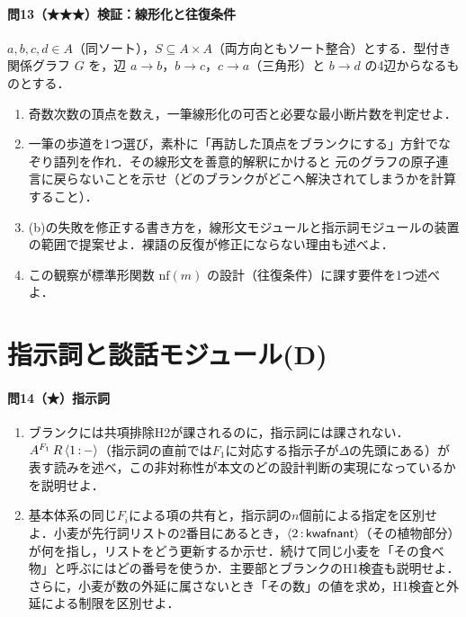 \documentclass[../../main-detail.tex]{subfiles}
\begin{document}
\paragraph{問13（★★★）検証：線形化と往復条件}
$a, b, c, d \in A$（同ソート），$S \subseteq A \times A$（両方向ともソート整合）とする．型付き関係グラフ $G$ を，辺 $a \to b$，$b \to c$，$c \to a$（三角形）と $b \to d$ の4辺からなるものとする．
\begin{enumerate}[label=(\alph*)]
    \item 奇数次数の頂点を数え，一筆線形化の可否と必要な最小断片数を判定せよ．
    \item 一筆の歩道を1つ選び，素朴に「再訪した頂点をブランクにする」方針でなぞり語列を作れ．その線形文を善意的解釈にかけると 元のグラフの原子連言に戻らないことを示せ（どのブランクがどこへ解決されてしまうかを計算すること）．
    \item (b)の失敗を修正する書き方を，線形文モジュールと指示詞モジュールの装置の範囲で提案せよ．裸語の反復が修正にならない理由も述べよ．
    \item この観察が標準形関数 $\mathrm{nf}(m)$ の設計（往復条件）に課す要件を1つ述べよ．
\end{enumerate}

\section{指示詞と談話モジュール(D)}

\paragraph{問14（★）指示詞}
\begin{enumerate}[label=(\alph*)]
    \item ブランクには共項排除H2が課されるのに，指示詞には課されない．$A^{F_1}\,R\,\mathopen{\langle}1\,{:}\,-\mathclose{\rangle}$（指示詞の直前では$F_1$に対応する指示子が$\Delta$の先頭にある）が表す読みを述べ，この非対称性が本文のどの設計判断の実現になっているかを説明せよ．
    \item 基本体系の同じ$F_i$による項の共有と，指示詞の$n$個前による指定を区別せよ．小麦が先行詞リストの2番目にあるとき，$\mathopen{\langle}2\,{:}\,\textsf{kwafnant}\mathclose{\rangle}$（その植物部分）が何を指し，リストをどう更新するか示せ．続けて同じ小麦を「その食べ物」と呼ぶにはどの番号を使うか．主要部とブランクのH1検査も説明せよ．さらに，小麦が数の外延に属さないとき「その数」の値を求め，H1検査と外延による制限を区別せよ．
\end{enumerate}
\end{document}
